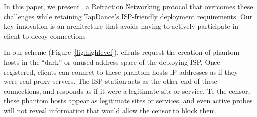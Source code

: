 \documentclass[sigconf,anonymous]{acmart}
\newcommand{\TODO}[1]{\hl{TODO: #1}\xspace}
\begin{document}



\smallskip

In this paper, we present \textbf{\scheme}, a Refraction
Networking protocol that overcomes these challenges while retaining
TapDance's ISP-friendly deployment requirements.
Our key innovation is an architecture that avoids
having to actively participate in client-to-decoy connections.

In our scheme (Figure~\ref{fig:highlevel}), clients
request the creation of phantom hosts in the ``dark''
or unused address space of the deploying ISP. Once registered, clients
can connect to these phantom hosts IP addresses as if they were real
proxy servers. The ISP station acts as the other end of these connections, and
responds as if it were a legitimate site or service. To the censor,
these phantom hosts appear as legitimate sites or services, and even
active probes will not reveal information that would allow the censor to
block them.


\end{document}
